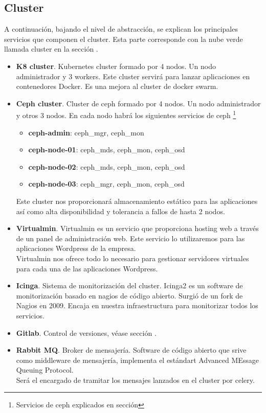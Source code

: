 	\subsection{Cluster}
		\begin{paragraph}
			A continuación, bajando el nivel de abstracción, se explican los principales servicios que componen el cluster. Esta parte corresponde con la nube verde llamada cluster en la sección .
			\begin{itemize}
				\item \textbf{K8 cluster}. Kubernetes cluster formado por 4 nodos. Un nodo administrador y 3 workers. Este cluster servirá para lanzar aplicaciones en contenedores Docker. Es una mejora al cluster de docker swarm.
				\item \textbf{Ceph cluster}. Cluster de ceph formado por 4 nodos. Un nodo administrador y otros 3 nodos. En cada nodo habrá los siguientes servicios de ceph \footnote{Servicios de ceph explicados en sección }
				\begin{itemize}
					\item \textbf{ceph-admin}: ceph\_mgr, ceph\_mon
					\item \textbf{ceph-node-01}: ceph\_mds, ceph\_mon, ceph\_osd
					\item \textbf{ceph-node-02}: ceph\_mds, ceph\_mon, ceph\_osd
					\item \textbf{ceph-node-03}: ceph\_mgr, ceph\_mon, ceph\_osd
				\end{itemize}
				Este cluster nos proporcionará almacenamiento estático para las aplicaciones así como alta disponibilidad y tolerancia a fallos de hasta 2 nodos.
				
				\item \textbf{Virtualmin}. Virtualmin \cite{virtualmin:online} es un servicio que proporciona hosting web a través de un panel de administración web. Este servicio lo utilizaremos para las aplicaciones Wordpress de la empresa. \\
				Virtualmin nos ofrece todo lo necesario para gestionar servidores virtuales para cada una de las aplicaciones Wordpress. 
				\item \textbf{Icinga}. Sistema de monitorización del cluster. Icinga2 es un software de monitorización basado en nagios de código abierto. Surgió de un fork de Nagios en 2009. Encaja en nuestra infraestructura para monitorizar todos los servicios.
				\item \textbf{Gitlab}. Control de versiones, véase sección .
				\item \textbf{Rabbit MQ}. Broker de mensajería. Software de código abierto que srive como middleware de mensajería, implementa el estándart Advanced MEssage Queuing Protocol. \\ 
				Será el encargado de tramitar los mensajes lanzados en el cluster por celery. 
			\end{itemize}
		\clearpage

\end{paragraph}
